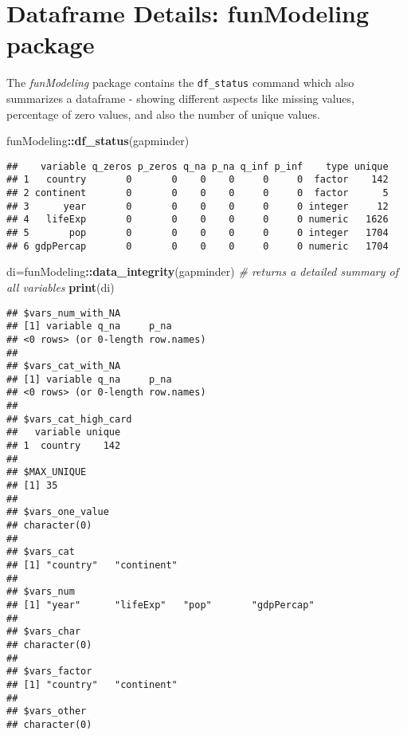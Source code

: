 \documentclass[
]{book}
\newenvironment{Shaded}{\begin{snugshade}}{\end{snugshade}}
\newcommand{\CommentTok}[1]{\textcolor[rgb]{0.56,0.35,0.01}{\textit{#1}}}
\newcommand{\KeywordTok}[1]{\textcolor[rgb]{0.13,0.29,0.53}{\textbf{#1}}}
\newcommand{\NormalTok}[1]{#1}
\newcommand{\OperatorTok}[1]{\textcolor[rgb]{0.81,0.36,0.00}{\textbf{#1}}}
\begin{document}
\hypertarget{dataframe-details-funmodeling-package}{%
\section{Dataframe Details: funModeling package}\label{dataframe-details-funmodeling-package}}

The \emph{funModeling} package contains the \texttt{df\_status} command which also summarizes
a dataframe - showing different aspects like missing values, percentage of zero
values, and also the number of unique values.

\begin{Shaded}
\begin{Highlighting}[]
\NormalTok{funModeling}\OperatorTok{::}\KeywordTok{df_status}\NormalTok{(gapminder)}
\end{Highlighting}
\end{Shaded}

\begin{verbatim}
##    variable q_zeros p_zeros q_na p_na q_inf p_inf    type unique
## 1   country       0       0    0    0     0     0  factor    142
## 2 continent       0       0    0    0     0     0  factor      5
## 3      year       0       0    0    0     0     0 integer     12
## 4   lifeExp       0       0    0    0     0     0 numeric   1626
## 5       pop       0       0    0    0     0     0 integer   1704
## 6 gdpPercap       0       0    0    0     0     0 numeric   1704
\end{verbatim}

\begin{Shaded}
\begin{Highlighting}[]
\NormalTok{di=funModeling}\OperatorTok{::}\KeywordTok{data_integrity}\NormalTok{(gapminder)}
\CommentTok{# returns a detailed summary of all variables}
\KeywordTok{print}\NormalTok{(di)}
\end{Highlighting}
\end{Shaded}

\begin{verbatim}
## $vars_num_with_NA
## [1] variable q_na     p_na    
## <0 rows> (or 0-length row.names)
## 
## $vars_cat_with_NA
## [1] variable q_na     p_na    
## <0 rows> (or 0-length row.names)
## 
## $vars_cat_high_card
##   variable unique
## 1  country    142
## 
## $MAX_UNIQUE
## [1] 35
## 
## $vars_one_value
## character(0)
## 
## $vars_cat
## [1] "country"   "continent"
## 
## $vars_num
## [1] "year"      "lifeExp"   "pop"       "gdpPercap"
## 
## $vars_char
## character(0)
## 
## $vars_factor
## [1] "country"   "continent"
## 
## $vars_other
## character(0)
\end{verbatim}
\end{document}
